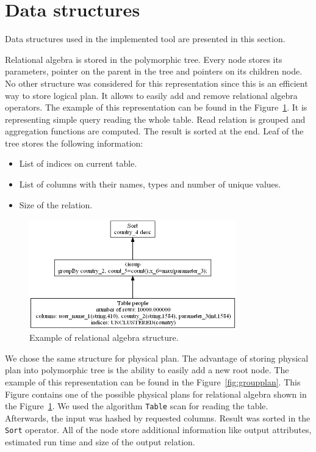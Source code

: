 \section{Data structures}

Data structures used in the implemented tool are presented in this section.

Relational algebra is stored in the polymorphic tree. Every node stores its parameters, pointer on the parent in the tree and pointers on its children node. No other structure was considered for this representation since this is an efficient way to store logical plan. It allows to easily add and remove relational algebra operators.
The example of this representation can be found in the Figure~\ref{fig:groupalgebra}. It is representing simple query reading the whole table. Read relation is grouped and aggregation functions are computed. The result is sorted at the end. Leaf of the tree stores the following information:
\begin{itemize}
\item List of indices on current table.
\item List of columns with their names, types and number of unique values.
\item Size of the relation.
\end{itemize}
\begin{figure}[h!]
  \centering
    \includegraphics[width=0.8\textwidth]{groupalgebra}

      \caption{Example of relational algebra structure.}
          \label{fig:groupalgebra}
\end{figure}

We chose the same structure for physical plan. The advantage of storing physical plan into polymorphic tree is the ability to easily add a new root node. The example of this representation can be found in the Figure~\ref{fig:groupplan}. This Figure contains one of the possible physical plans for relational algebra shown in the Figure~\ref{fig:groupalgebra}. We used the algorithm \texttt{Table} scan for reading the table. Afterwards, the input was hashed by requested columns. Result was sorted in the \texttt{Sort} operator. All of the node store additional information like output attributes, estimated run time and size of the output relation.

